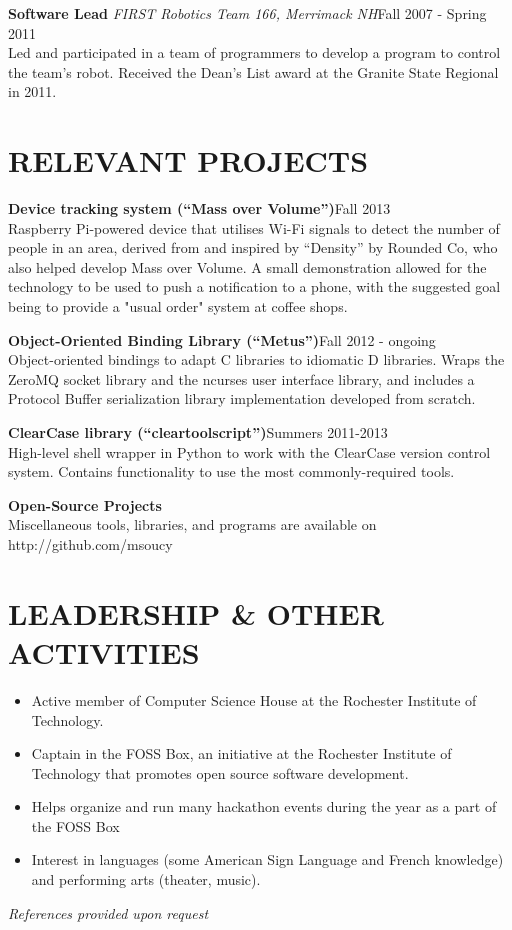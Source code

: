 \documentclass[line]{res}
\newcommand{\project}[2]{{\bf #1}\hfill #2\\}
\newcommand{\job}[3]{{\bf #1} {\it #2}\hfill #3\\}
\begin{document}
\begin{resume}
	\job{Software Lead}{FIRST Robotics Team 166, Merrimack NH}{Fall 2007 - Spring 2011}
	Led and participated in a team of programmers to develop a program to control the team's robot.
	Received the Dean's List award at the Granite State Regional in 2011.

\section{RELEVANT PROJECTS}

	\project{Device tracking system (``Mass over Volume'')}{Fall 2013}
	Raspberry Pi-powered device that utilises Wi-Fi signals to detect the number of people in an area, derived from and inspired by ``Density'' by Rounded Co, who also helped develop Mass over Volume.
	A small demonstration allowed for the technology to be used to push a notification to a phone, with the suggested goal being to provide a "usual order" system at coffee shops.

	\project{Object-Oriented Binding Library (``Metus'')}{Fall 2012 - ongoing}
	Object-oriented bindings to adapt C libraries to idiomatic D libraries.
	Wraps the ZeroMQ socket library and the ncurses user interface library, and includes a Protocol Buffer serialization library implementation developed from scratch.

	\project{ClearCase library (``cleartoolscript'')}{Summers 2011-2013}
	High-level shell wrapper in Python to work with the ClearCase version control system. Contains functionality to use the most commonly-required tools.

	\project{Open-Source Projects}{}
	Miscellaneous tools, libraries, and programs are available on http://github.com/msoucy

\section{LEADERSHIP \& OTHER ACTIVITIES}
	\begin{itemize}[leftmargin=10pt]
	\item Active member of Computer Science House at the Rochester Institute of Technology.
	\item Captain in the FOSS Box, an initiative at the Rochester Institute of Technology that promotes open source software development.
	\item Helps organize and run many hackathon events during the year as a part of the FOSS Box
	\item Interest in languages (some American Sign Language and French knowledge) and performing arts (theater, music).
	\end{itemize}

\begin{center}
\vspace{-0.26in}
\emph{References provided upon request\\[8pt]}
\end{center}

\end{resume}
\end{document}
